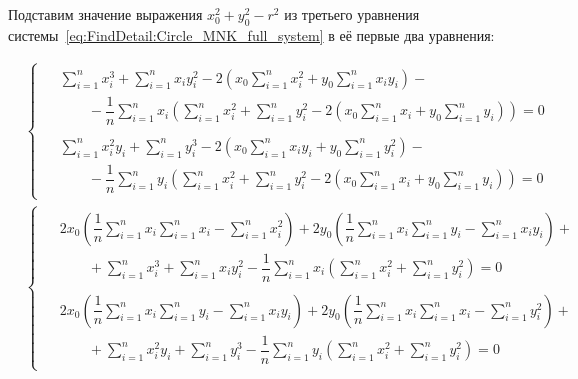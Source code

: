 Подставим значение выражения $x_0^2 + y_0^2 - r^2$ из третьего уравнения системы~\ref{eq:FindDetail:Circle_MNK_full_system} в её первые два уравнения:

\begin{align}
    \nonumber
    &\begin{cases}
         \begin{aligned}
             &\sum_{i=1}^{n} x_i^3 + \sum_{i=1}^{n} x_i y_i^2 - 2 \left(
             x_0 \sum_{i=1}^{n} x_i^2 + y_0 \sum_{i=1}^{n} x_i y_i \right) - \\
             &\qquad - \dfrac{1}{n} \sum_{i=1}^{n} x_i \left(
             \sum_{i=1}^{n} x_i^2 + \sum_{i=1}^{n} y_i^2
             - 2 \left( x_0 \sum_{i=1}^{n} x_i + y_0 \sum_{i=1}^{n} y_i \right)\right) = 0 \\
             \\
             &\sum_{i=1}^{n} x_i^2 y_i + \sum_{i=1}^{n} y_i^3 - 2 \left(
             x_0 \sum_{i=1}^{n} x_i y_i + y_0 \sum_{i=1}^{n} y_i^2 \right) - \\
             &\qquad - \dfrac{1}{n} \sum_{i=1}^{n} y_i \left(
             \sum_{i=1}^{n} x_i^2 + \sum_{i=1}^{n} y_i^2
             - 2 \left( x_0 \sum_{i=1}^{n} x_i + y_0 \sum_{i=1}^{n} y_i \right)\right) = 0
         \end{aligned}
    \end{cases} \\ \nonumber
    &\begin{cases}
         \begin{aligned}
             &2 x_0 \left( \dfrac{1}{n} \sum_{i=1}^{n} x_i \sum_{i=1}^{n} x_i - \sum_{i=1}^{n} x_i^2 \right)
             + 2 y_0 \left( \dfrac{1}{n} \sum_{i=1}^{n} x_i \sum_{i=1}^{n} y_i
             - \sum_{i=1}^{n} x_i y_i \right) + \\
             &\qquad + \sum_{i=1}^{n} x_i^3 + \sum_{i=1}^{n} x_i y_i^2
             - \dfrac{1}{n} \sum_{i=1}^{n} x_i
             \left( \sum_{i=1}^{n} x_i^2 + \sum_{i=1}^{n} y_i^2 \right) = 0 \\
             \\
             &2 x_0 \left( \dfrac{1}{n} \sum_{i=1}^{n} x_i \sum_{i=1}^{n} y_i
             - \sum_{i=1}^{n} x_i y_i \right)
             + 2 y_0 \left( \dfrac{1}{n} \sum_{i=1}^{n} x_i \sum_{i=1}^{n} x_i - \sum_{i=1}^{n} y_i^2 \right) + \\
             &\qquad + \sum_{i=1}^{n} x_i^2 y_i + \sum_{i=1}^{n} y_i^3
             - \dfrac{1}{n} \sum_{i=1}^{n} y_i
             \left(\sum_{i=1}^{n} x_i^2 + \sum_{i=1}^{n} y_i^2 \right) = 0

\end{aligned}
\end{cases}
\end{align}
